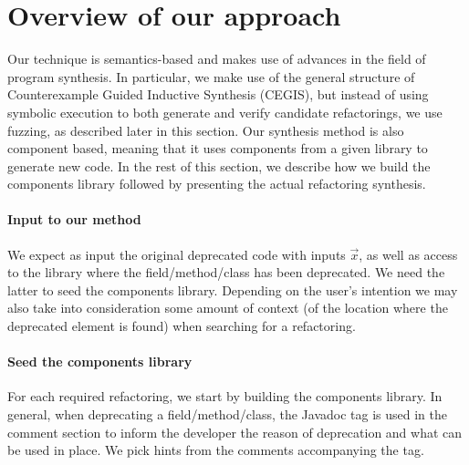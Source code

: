 \documentclass[runningheads,a4paper]{llncs}
\begin{document}
%



\section{Overview of our approach} \label{sec:approach}

Our technique is semantics-based and makes use of advances in the field of program synthesis. In particular, we make use of the general structure of Counterexample Guided Inductive Synthesis (CEGIS),
but instead of using symbolic execution to both generate and verify candidate refactorings, we use fuzzing, as described later in this section.
Our synthesis method is also component based, meaning that it uses components from a given library to generate new code.
In the rest of this section, we describe how we build the components library followed by presenting the actual refactoring synthesis.

\paragraph{{\bf Input to our method}}
We expect as input the original deprecated code  with inputs
$\vec{x}$, as well as access to the library where the
field/method/class has been deprecated. We need the latter to seed the
components library.  Depending on the user's intention we may also
take into consideration some amount of context (of the location where
the deprecated element is found) when searching for a refactoring.

\paragraph{{\bf Seed the components library}}
For each required refactoring, we start by building the components library.
In general, when deprecating a field/method/class, the
 Javadoc tag is used in the comment section to
inform the developer the reason of deprecation and what can be used in
place. We pick hints from the comments accompanying the
 tag.
\end{document}
